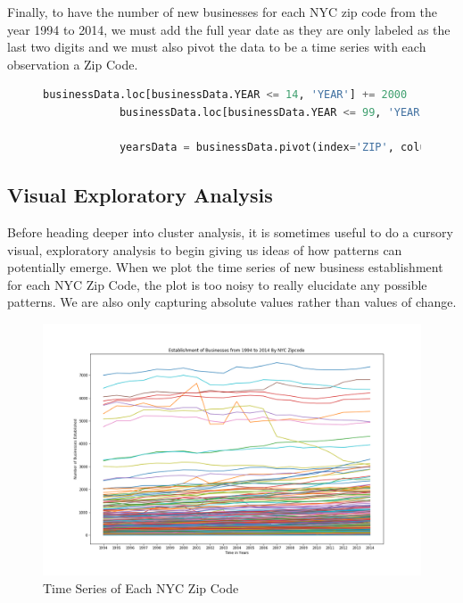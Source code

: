 \documentclass[letter, 11pt]{article} %
\begin{document}
		\pagebreak
		
		\noindent Finally, to have the number of new businesses for each NYC zip code from the year 1994 to 2014, we must add the full year date as they are only labeled as the last two digits and we must also pivot the data to be a time series with each observation a Zip Code.
		
		\begin{figure}[H]
			\centering
			\begin{lstlisting}[language=python]
			businessData.loc[businessData.YEAR <= 14, 'YEAR'] += 2000
			businessData.loc[businessData.YEAR <= 99, 'YEAR'] += 1900

			yearsData = businessData.pivot(index='ZIP', columns='YEAR', values='EST')
			\end{lstlisting}
		\end{figure}
		
		\pagebreak
		
	\subsection{Visual Exploratory Analysis}
	
		Before heading deeper into cluster analysis, it is sometimes useful to do a cursory visual, exploratory analysis to begin giving us ideas of how patterns can potentially emerge. When we plot the time series of new business establishment for each NYC Zip Code, the plot is too noisy to really elucidate any possible patterns. We are also only capturing absolute values rather than values of change.
	
		\begin{figure}[H]
			\centering
			\caption{Time Series of Each NYC Zip Code}
			\includegraphics[width=\textwidth]{nonnormalized.png}
		\end{figure}
		
\end{document}
